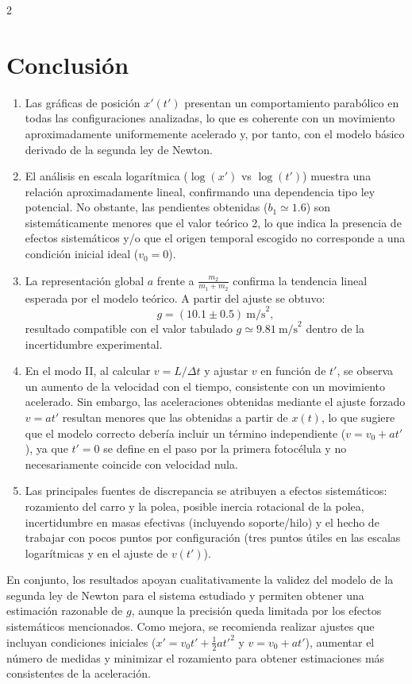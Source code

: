 \documentclass[12pt,a4paper]{article}
\begin{document}
\begin{multicols}{2}
\section{Conclusión}

\begin{enumerate}
\item Las gráficas de posición $x'(t')$ presentan un comportamiento parabólico en todas las configuraciones analizadas, lo que es coherente con un movimiento aproximadamente uniformemente acelerado y, por tanto, con el modelo básico derivado de la segunda ley de Newton.

\item El análisis en escala logarítmica ($\log(x')$ vs $\log(t')$) muestra una relación aproximadamente lineal, confirmando una dependencia tipo ley potencial. No obstante, las pendientes obtenidas ($b_1 \simeq 1.6$) son sistemáticamente menores que el valor teórico 2, lo que indica la presencia de efectos sistemáticos y/o que el origen temporal escogido no corresponde a una condición inicial ideal ($v_0=0$).

\item La representación global $a$ frente a $\frac{m_2}{m_1+m_2}$ confirma la tendencia lineal esperada por el modelo teórico. A partir del ajuste se obtuvo:
\[
g = (10.1 \pm 0.5)\ \text{m/s}^2,
\]
resultado compatible con el valor tabulado $g \simeq 9.81\ \text{m/s}^2$ dentro de la incertidumbre experimental.

\item En el modo II, al calcular $v=L/\Delta t$ y ajustar $v$ en función de $t'$, se observa un aumento de la velocidad con el tiempo, consistente con un movimiento acelerado. Sin embargo, las aceleraciones obtenidas mediante el ajuste forzado $v=a t'$ resultan menores que las obtenidas a partir de $x(t)$, lo que sugiere que el modelo correcto debería incluir un término independiente ($v=v_0+at'$), ya que $t'=0$ se define en el paso por la primera fotocélula y no necesariamente coincide con velocidad nula.

\item Las principales fuentes de discrepancia se atribuyen a efectos sistemáticos: rozamiento del carro y la polea, posible inercia rotacional de la polea, incertidumbre en masas efectivas (incluyendo soporte/hilo) y el hecho de trabajar con pocos puntos por configuración (tres puntos útiles en las escalas logarítmicas y en el ajuste de $v(t')$).
\end{enumerate}

En conjunto, los resultados apoyan cualitativamente la validez del modelo de la segunda ley de Newton para el sistema estudiado y permiten obtener una estimación razonable de $g$, aunque la precisión queda limitada por los efectos sistemáticos mencionados. Como mejora, se recomienda realizar ajustes que incluyan condiciones iniciales ($x'=v_0t'+\tfrac12 at'^2$ y $v=v_0+at'$), aumentar el número de medidas y minimizar el rozamiento para obtener estimaciones más consistentes de la aceleración.


\end{multicols}
\end{document}
